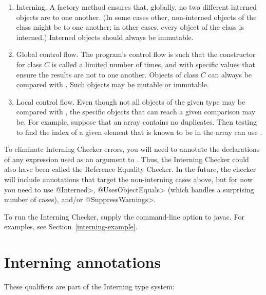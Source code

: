 \begin{enumerate}
\item
  Interning.  A factory method ensures that, globally, no two different
  interned objects are  to one another.  (In some cases
  other, non-interned objects of the class might be  to one
  another; in other cases, every object of the class is interned.)
  Interned objects should always be immutable.
\item
  Global control flow.  The program's control flow is such that the
  constructor for class $C$ is called a limited number of times, and with
  specific values that ensure the results are not  to one
  another.  Objects of class $C$ can always be compared with \code{==}.
  Such objects may be mutable or immutable.
\item
  Local control flow.  Even though not all objects of the given type may be
  compared with \code{==}, the specific objects that can reach a given
  comparison may be.  For example, suppose that an array contains no
  duplicates.  Then testing to find the index of a given element that is
  known to be in the array can use \code{==}.
\end{enumerate}

To eliminate Interning Checker errors, you will need to annotate the
declarations of any expression used as an argument to \code{==}.
Thus, the Interning Checker
could also have been called the Reference Equality Checker.  In the
future, the checker will include annotations that target the non-interning
cases above, but for now you need to use \<@Interned>, \<@UsesObjectEquals>
(which handles a surprising number of cases), and/or
\<@SuppressWarnings>.

To run the Interning Checker, supply the
command-line option to javac.  For examples, see Section~\ref{interning-example}.


\section{Interning annotations\label{interning-annotations}}

These qualifiers are part of the Interning type system:

